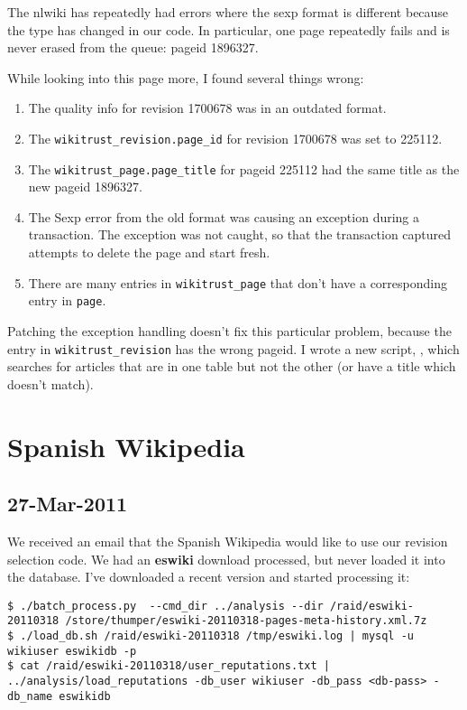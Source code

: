 The nlwiki has repeatedly had errors where the sexp format is
different because the type has changed in our code.
In particular, one page repeatedly fails and is never erased from
the queue: pageid 1896327.

While looking into this page more, I found several things wrong:
\begin{enumerate}
\item The quality info for revision 1700678 was in an outdated format.
\item The \texttt{wikitrust\_revision.page\_id} for revision 1700678 was set
    to 225112.
\item The \texttt{wikitrust\_page.page\_title} for pageid 225112 had the same
    title as the new pageid 1896327.
\item The Sexp error from the old format was causing an exception
    during a transaction.  The exception was not caught, so that the
    transaction captured attempts to delete the page and start fresh.
\item There are many entries in \texttt{wikitrust\_page} that don't have a
    corresponding entry in \texttt{page}.
\end{enumerate}

Patching the exception handling doesn't fix this particular problem,
because the entry in \texttt{wikitrust\_revision} has the wrong pageid.
I wrote a new script, , which searches for
articles that are in one table but not the other (or have a title
which doesn't match).


\section{Spanish Wikipedia}

\subsection{27-Mar-2011}

We received an email that the Spanish Wikipedia would like to use
our revision selection code.
We had an \textbf{eswiki} download processed, but never
loaded it into the database.
I've downloaded a recent version and started processing it:
\begin{verbatim}
$ ./batch_process.py  --cmd_dir ../analysis --dir /raid/eswiki-20110318 /store/thumper/eswiki-20110318-pages-meta-history.xml.7z
$ ./load_db.sh /raid/eswiki-20110318 /tmp/eswiki.log | mysql -u wikiuser eswikidb -p
$ cat /raid/eswiki-20110318/user_reputations.txt | ../analysis/load_reputations -db_user wikiuser -db_pass <db-pass> -db_name eswikidb
\end{verbatim}

